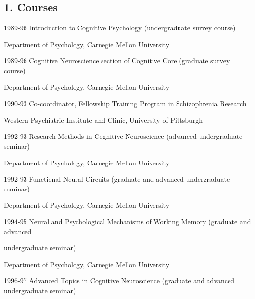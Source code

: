 \documentclass[10 pt]{article}
\begin{document}
\subsection*{1. Courses} \label{secTEACHING1}
    \medskip

1989-96 \hspace{0.3in} Introduction to Cognitive Psychology (undergraduate survey course)

\hspace{0.81in} Department of Psychology, Carnegie Mellon University
    \smallskip

1989-96 \hspace{0.3in} Cognitive Neuroscience section of Cognitive Core (graduate survey course)

\hspace{0.81in} Department of Psychology, Carnegie Mellon University
    \smallskip

1990-93 \hspace{0.3in} Co-coordinator, Fellowship Training Program in Schizophrenia Research

\hspace{0.81in} Western Psychiatric Institute and Clinic, University of Pittsburgh
    \smallskip

1992-93 \hspace{0.3in} Research Methods in Cognitive Neuroscience (advanced undergraduate seminar)

\hspace{0.81in} Department of Psychology, Carnegie Mellon University
    \smallskip

1992-93 \hspace{0.3in} Functional Neural Circuits (graduate and advanced undergraduate seminar)

\hspace{0.81in} Department of Psychology, Carnegie Mellon University
    \smallskip

1994-95 \hspace{0.3in} Neural and Psychological Mechanisms of Working Memory (graduate and advanced

\hspace{0.81in} undergraduate seminar)

\hspace{0.81in} Department of Psychology, Carnegie Mellon University
    \smallskip

1996-97 \hspace{0.3in} Advanced Topics in Cognitive Neuroscience (graduate and advanced undergraduate seminar)
\end{document}
